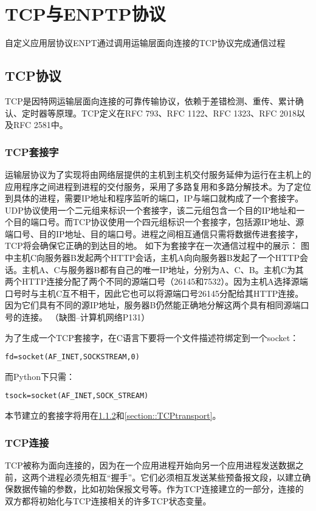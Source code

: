 
\chapter{TCP与ENPTP协议}
\label{Chapter::two}

自定义应用层协议ENPT通过调用运输层面向连接的TCP协议完成通信过程
\section{TCP协议}
TCP是因特网运输层面向连接的可靠传输协议，依赖于差错检测、重传、累计确认、定时器等原理。TCP定义在RFC 793、RFC 1122、RFC 1323、RFC 2018以及RFC 2581中。

\subsection{TCP套接字}
\label{section::TCPsocket}
运输层协议为了实现将由网络层提供的主机到主机交付服务延伸为运行在主机上的应用程序之间进程到进程的交付服务，采用了多路复用和多路分解技术。为了定位到具体的进程，需要IP地址和程序监听的端口，IP与端口就构成了一个套接字。UDP协议使用一个二元组来标识一个套接字，该二元组包含一个目的IP地址和一个目的端口号。而TCP协议使用一个四元组标识一个套接字，包括源IP地址、源端口号、目的IP地址、目的端口号。进程之间相互通信只需将数据传进套接字，TCP将会确保它正确的到达目的地。
如下为套接字在一次通信过程中的展示：
图中主机C向服务器B发起两个HTTP会话，主机A向向服务器B发起了一个HTTP会话。主机A、C与服务器B都有自己的唯一IP地址，分别为A、C、B。主机C为其两个HTTP连接分配了两个不同的源端口号（26145和7532）。因为主机A选择源端口号时与主机C互不相干，因此它也可以将源端口号26145分配给其HTTP连接。因为它们具有不同的源IP地址，服务器B仍然能正确地分解这两个具有相同源端口号的连接。
（缺图--计算机网络P131）

\noindent 为了生成一个TCP套接字，在C语言下要将一个文件描述符绑定到一个socket：
\begin{verbatim}
fd=socket(AF_INET,SOCKSTREAM,0)
\end{verbatim}

\noindent 而Python下只需：
\begin{verbatim}
tsock=socket(AF_INET,SOCK_STREAM)
\end{verbatim}

本节建立的套接字将用在\ref{section::TCPconnect}和\ref{section::TCPtransport}。

\subsection{TCP连接}
\label{section::TCPconnect}
TCP被称为面向连接的，因为在一个应用进程开始向另一个应用进程发送数据之前，这两个进程必须先相互“握手”。它们必须相互发送某些预备报文段，以建立确保数据传输的参数，比如初始保报文号等。作为TCP连接建立的一部分，连接的双方都将初始化与TCP连接相关的许多TCP状态变量。

